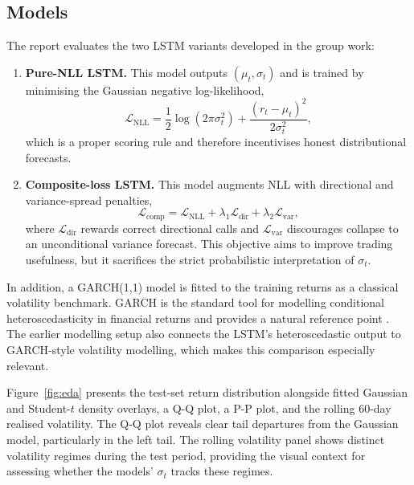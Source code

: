 \documentclass[%
 amsmath,amssymb,
 aps,
 pra,
 floatfix,
 raggedbottom,
 nofootinbib,
12pt,]{revtex4-2}
\begin{document}
\subsection{Models}

The report evaluates the two LSTM variants developed in the group work:
\begin{enumerate}
    \item \textbf{Pure-NLL LSTM.}
    This model outputs $(\mu_t, \sigma_t)$ and is trained by minimising the Gaussian negative log-likelihood,
    \begin{equation}
        \mathcal{L}_{\text{NLL}} = \frac{1}{2}\log(2\pi\sigma_t^2) + \frac{(r_t-\mu_t)^2}{2\sigma_t^2},
        \label{eq:nll}
    \end{equation}
    which is a proper scoring rule and therefore incentivises honest distributional forecasts.

    \item \textbf{Composite-loss LSTM.}
    This model augments NLL with directional and variance-spread penalties,
    \begin{equation}
        \mathcal{L}_{\text{comp}} = \mathcal{L}_{\text{NLL}} + \lambda_1\mathcal{L}_{\text{dir}} + \lambda_2\mathcal{L}_{\text{var}},
        \label{eq:comp}
    \end{equation}
    where $\mathcal{L}_{\text{dir}}$ rewards correct directional calls and $\mathcal{L}_{\text{var}}$ discourages collapse to an unconditional variance forecast.
    This objective aims to improve trading usefulness, but it sacrifices the strict probabilistic interpretation of $\sigma_t$.
\end{enumerate}

In addition, a GARCH(1,1) model is fitted to the training returns as a classical volatility benchmark.
GARCH is the standard tool for modelling conditional heteroscedasticity in financial returns and provides a natural reference point \citep{engle1982,bollerslev1986generalized}.
The earlier modelling setup also connects the LSTM's heteroscedastic output to GARCH-style volatility modelling, which makes this comparison especially relevant.

Figure~\ref{fig:eda} presents the test-set return distribution alongside fitted Gaussian and Student-$t$ density overlays, a Q-Q plot, a P-P plot, and the rolling 60-day realised volatility.
The Q-Q plot reveals clear tail departures from the Gaussian model, particularly in the left tail.
The rolling volatility panel shows distinct volatility regimes during the test period, providing the visual context for assessing whether the models' $\sigma_t$ tracks these regimes.
\end{document}
